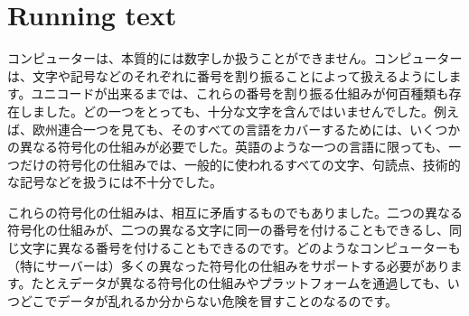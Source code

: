 \section{Running text}

\begin{CJK}
コンピューターは、本質的には数字しか扱うことができません。コンピューターは、文字や記号などのそれぞれに番号を割り振ることによって扱えるようにします。ユニコードが出来るまでは、これらの番号を割り振る仕組みが何百種類も存在しました。どの一つをとっても、十分な文字を含んではいませんでした。例えば、欧州連合一つを見ても、そのすべての言語をカバーするためには、いくつかの異なる符号化の仕組みが必要でした。英語のような一つの言語に限っても、一つだけの符号化の仕組みでは、一般的に使われるすべての文字、句読点、技術的な記号などを扱うには不十分でした。


これらの符号化の仕組みは、相互に矛盾するものでもありました。二つの異なる符号化の仕組みが、二つの異なる文字に同一の番号を付けることもできるし、同じ文字に異なる番号を付けることもできるのです。どのようなコンピューターも（特にサーバーは）多くの異なった符号化の仕組みをサポートする必要があります。たとえデータが異なる符号化の仕組みやプラットフォームを通過しても、いつどこでデータが乱れるか分からない危険を冒すことのなるのです。

\end{CJK}